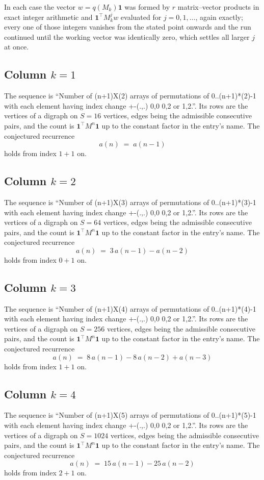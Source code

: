 \documentclass[11pt,a4paper]{article}
\theoremstyle{plain}
\theoremstyle{definition}
\begin{document}
In each case the vector $w=q(M_k)\mathbf{1}$ was formed by $r$ matrix--vector products in
exact integer arithmetic and $\mathbf{1}^{\!\top}M_k^{j}w$ evaluated for $j=0,1,\dots$,
again exactly; every one of those integers vanishes from the stated point onwards and the run
continued until the working vector was identically zero, which settles all larger $j$ at once.

\subsection*{Column $k$$=1$}
The sequence is ``Number of (n+1)X(2) arrays of permutations of 0..(n+1)*(2)-1 with each element having index change +-(.,.) 0,0 0,2 or 1,2.''. Its rows are the vertices of a digraph on
$S=16$ vertices, edges being the admissible consecutive pairs, and the count is
$\mathbf{1}^{\!\top}M^{n}\mathbf{1}$ up to the constant factor in the entry's name.
The conjectured recurrence
\[
a(n)\;=\;a(n-1)
\]
holds from index $1+1$ on.

\subsection*{Column $k$$=2$}
The sequence is ``Number of (n+1)X(3) arrays of permutations of 0..(n+1)*(3)-1 with each element having index change +-(.,.) 0,0 0,2 or 1,2.''. Its rows are the vertices of a digraph on
$S=64$ vertices, edges being the admissible consecutive pairs, and the count is
$\mathbf{1}^{\!\top}M^{n}\mathbf{1}$ up to the constant factor in the entry's name.
The conjectured recurrence
\[
a(n)\;=\;3\,a(n-1) - a(n-2)
\]
holds from index $0+1$ on.

\subsection*{Column $k$$=3$}
The sequence is ``Number of (n+1)X(4) arrays of permutations of 0..(n+1)*(4)-1 with each element having index change +-(.,.) 0,0 0,2 or 1,2.''. Its rows are the vertices of a digraph on
$S=256$ vertices, edges being the admissible consecutive pairs, and the count is
$\mathbf{1}^{\!\top}M^{n}\mathbf{1}$ up to the constant factor in the entry's name.
The conjectured recurrence
\[
a(n)\;=\;8\,a(n-1) - 8\,a(n-2) + a(n-3)
\]
holds from index $1+1$ on.

\subsection*{Column $k$$=4$}
The sequence is ``Number of (n+1)X(5) arrays of permutations of 0..(n+1)*(5)-1 with each element having index change +-(.,.) 0,0 0,2 or 1,2.''. Its rows are the vertices of a digraph on
$S=1024$ vertices, edges being the admissible consecutive pairs, and the count is
$\mathbf{1}^{\!\top}M^{n}\mathbf{1}$ up to the constant factor in the entry's name.
The conjectured recurrence
\[
a(n)\;=\;15\,a(n-1) - 25\,a(n-2)
\]
holds from index $2+1$ on.
\end{document}
